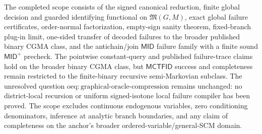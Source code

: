 The completed scope consists of the signed canonical reduction, finite global decision and guarded identifying functional on \(\mathfrak M(G,M)\), exact global failure certificates, order-normal factorization, empty-sign sanity theorem, fixed-branch plug-in limit, one-sided transfer of decoded failures to the broader published binary CGMA class, and the antichain/join \(\mathsf{MID}\) failure family with a finite sound \(\mathsf{MID}^{+}\) precheck.  The pointwise constant-query and published failure-trace claims hold on the broader binary CGMA class, but \(\mathsf{MCTFID}\) success and completeness remain restricted to the finite-binary recursive semi-Markovian subclass.  The unresolved question \(\mathrm{oeq:graphical\text{-}oracle\text{-}compression}\) remains unchanged: no district-local recursion or uniform signed-isotone local failure compiler has been proved.  The scope excludes continuous endogenous variables, zero conditioning denominators, inference at analytic branch boundaries, and any claim of completeness on the anchor's broader ordered-variable/general-SCM domain.